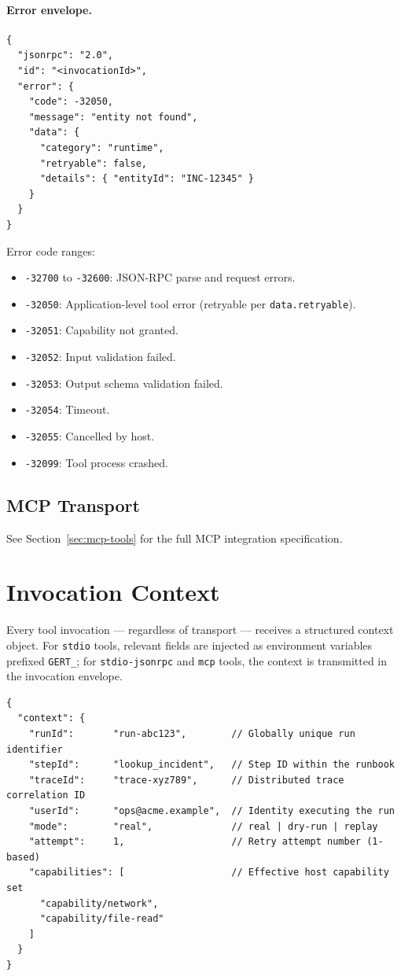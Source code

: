 \paragraph{Error envelope.}
\begin{verbatim}
{
  "jsonrpc": "2.0",
  "id": "<invocationId>",
  "error": {
    "code": -32050,
    "message": "entity not found",
    "data": {
      "category": "runtime",
      "retryable": false,
      "details": { "entityId": "INC-12345" }
    }
  }
}
\end{verbatim}

Error code ranges:

\begin{itemize}
  \item \texttt{-32700} to \texttt{-32600}: JSON-RPC parse and request errors.
  \item \texttt{-32050}: Application-level tool error (retryable per
        \texttt{data.retryable}).
  \item \texttt{-32051}: Capability not granted.
  \item \texttt{-32052}: Input validation failed.
  \item \texttt{-32053}: Output schema validation failed.
  \item \texttt{-32054}: Timeout.
  \item \texttt{-32055}: Cancelled by host.
  \item \texttt{-32099}: Tool process crashed.
\end{itemize}

\subsection{MCP Transport}

See Section~\ref{sec:mcp-tools} for the full MCP integration specification.

\section{Invocation Context}
\label{sec:tool-context}

Every tool invocation — regardless of transport — receives a structured
context object.  For \texttt{stdio} tools, relevant fields are injected as
environment variables prefixed \texttt{GERT\_}; for \texttt{stdio-jsonrpc} and
\texttt{mcp} tools, the context is transmitted in the invocation envelope.

\begin{verbatim}
{
  "context": {
    "runId":       "run-abc123",        // Globally unique run identifier
    "stepId":      "lookup_incident",   // Step ID within the runbook
    "traceId":     "trace-xyz789",      // Distributed trace correlation ID
    "userId":      "ops@acme.example",  // Identity executing the run
    "mode":        "real",              // real | dry-run | replay
    "attempt":     1,                   // Retry attempt number (1-based)
    "capabilities": [                   // Effective host capability set
      "capability/network",
      "capability/file-read"
    ]
  }
}
\end{verbatim}

